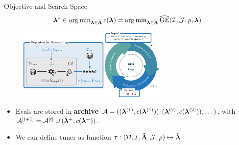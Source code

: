 \documentclass[11pt,compress,t,notes=noshow, xcolor=table]{beamer}
\begin{document}
\begin{vbframe}{Objective and Search Space}
\begin{eqnarray*}
    \bm{\lambda}^{*} \in \operatorname{arg\,min}_{\bm{\lambda} \in \tilde{\bm{\Lambda}}} c(\bm{\lambda}) = \operatorname{arg\,min}_{\bm{\lambda} \in \tilde{\bm{\Lambda}}} 
    \widehat{\mathrm{GE}}(\mathcal{I}, \mathcal{J}, \rho, \bm{\lambda})
\end{eqnarray*}
\begin{figure}[h]
    \centering
    \includegraphics[width = 0.65\textwidth]{figure/hpo_loop_1.eps}
\end{figure}

\begin{itemize}
    \item Evals are stored in \textbf{archive} $\mathcal{A} = ((\bm{\lambda}^{(1)}, c(\bm{\lambda}^{(1)})), (\bm{\lambda}^{(2)}, c(\bm{\lambda}^{(2)})), \dots)$, with $\mathcal{A}^{[t+1]} = \mathcal{A}^{[t]} \cup (\bm{\lambda}^+, c(\bm{\lambda}^+))$.


 \item We can define tuner as function $\tau: (\mathcal{D}, \mathcal{I}, \tilde{\bm{\Lambda}}, \mathcal{J}, \rho)\mapsto \hat{\bm{\lambda}}$ 
\end{itemize}



\end{vbframe}
\end{document}
